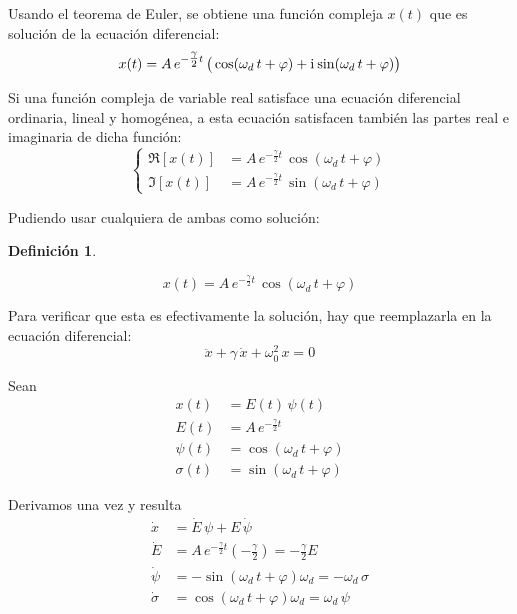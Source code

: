 \documentclass[a5paper,12pt,twoside]{book}
\newtheorem{defn}{{Definición}}[chapter]
\begin{document}
Usando el teorema de Euler, se obtiene una función compleja $x(t)$ que es solución de la ecuación diferencial:
\[
    x(t) = A \, e^{-\tfrac{\gamma}{2} t} \, \big( \cos(\omega_d \, t + \varphi) + \mathrm{i}\mkern1mu \sin(\omega_d \, t + \varphi) \big)
\]

Si una función compleja de variable real satisface una ecuación diferencial ordinaria, lineal y homogénea, a esta ecuación satisfacen también las partes real e imaginaria de dicha función:
\[
    \left\{
    \begin{aligned}
        \Re[x(t)] &= A \, e^{-\tfrac{\gamma}{2}t} \, \cos(\omega_d \, t + \varphi)
        \\
        \Im[x(t)] &= A \, e^{-\tfrac{\gamma}{2}t} \, \sin(\omega_d \, t + \varphi)
    \end{aligned}
    \right.
\]

Pudiendo usar cualquiera de ambas como solución:

\begin{mdframed}[style=MyFrame1]
    \begin{defn}
    \end{defn}
    \begin{equation*}
        x(t) = A \, e^{-\tfrac{\gamma}{2}t} \, \cos{(\omega_d \, t + \varphi)}
    \end{equation*}
\end{mdframed}

\begin{center}
    \vspace{-2cm}
    \def\svgwidth{\linewidth}
    
    \vspace{-2cm}
\end{center}

Para verificar que esta es efectivamente la solución, hay que reemplazarla en la ecuación diferencial:
\[
    \ddot{x} + \gamma \, \dot{x} + \omega_{0}^{2} \, x = 0
\]

Sean
\begin{align*}
    x(t) &= E(t) \, \psi(t)
    \\
    E(t) &= A \, e^{-\frac{\gamma}{2} t}
    \\
    \psi(t) &= \cos \left( \omega_d \, t + \varphi \right)
    \\
    \sigma(t) &= \sin \left( \omega_d \, t + \varphi \right)
\end{align*}

Derivamos una vez y resulta
\begin{align*}
    \dot{x} &= \dot{E} \, \psi + E \, \dot{\psi}
    \\
    \dot{E} &= A \, e^{-\frac{\gamma}{2} t} \left( - \frac{\gamma}{2} \right)
    = - \frac{\gamma}{2} E
    \\
    \dot{\psi} &= - \sin \left( \omega_d \, t + \varphi \right) \omega_d
    = - \omega_d \, \sigma
    \\
    \dot{\sigma} &= \cos \left( \omega_d \, t + \varphi \right) \omega_d
    = \omega_d \, \psi
\end{align*}
\end{document}
